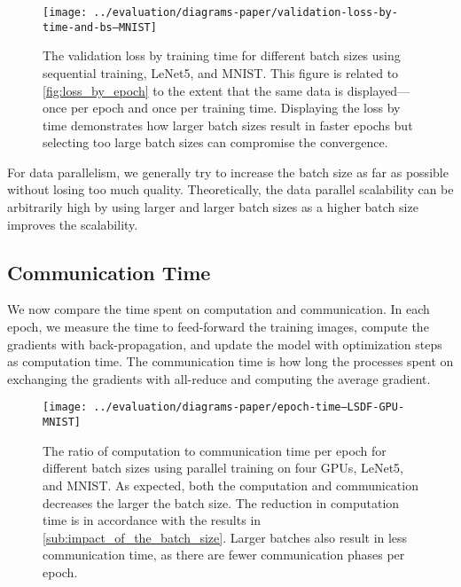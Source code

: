 \documentclass[conference,compsoc,a4paper]{IEEEtran}
\begin{document}
\begin{figure}[ht]
\centering
\texttt{[image: ../evaluation/diagrams-paper/validation-loss-by-time-and-bs--MNIST]}
\caption{The validation loss by training time for different batch sizes using sequential training, LeNet5, and MNIST.
This figure is related to \autoref{fig:loss_by_epoch} to the extent that the same data is displayed---once per epoch and once per training time.
Displaying the loss by time demonstrates how larger batch sizes result in faster epochs but selecting too large batch sizes can compromise the convergence.}
\label{fig:loss_by_time}
\end{figure}

For data parallelism, we generally try to increase the batch size as far as possible without losing too much quality.
Theoretically, the data parallel scalability can be arbitrarily high by using larger and larger batch sizes \cite{krizhevsky2014-One-weird-trick} as a higher batch size improves the scalability.


\subsection{Communication Time} %
\label{sub:communication_time}

We now compare the time spent on computation and communication.
In each epoch, we measure the time to feed-forward the training images, compute the gradients with back-propagation, and update the model with optimization steps as computation time.
The communication time is how long the processes spent on exchanging the gradients with all-reduce and computing the average gradient.

\begin{figure}[ht]
\centering
\texttt{[image: ../evaluation/diagrams-paper/epoch-time--LSDF-GPU-MNIST]}
\caption{The ratio of computation to communication time per epoch for different batch sizes using parallel training on four GPUs, LeNet5, and MNIST.
As expected, both the computation and communication decreases the larger the batch size.
The reduction in computation time is in accordance with the results in \autoref{sub:impact_of_the_batch_size}.
Larger batches also result in less communication time, as there are fewer communication phases per epoch.}
\label{fig:comm_time_by_batch_size}
\end{figure}
\end{document}
